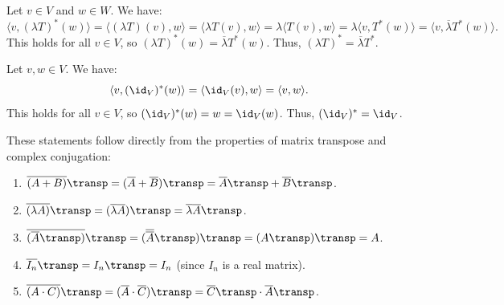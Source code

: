 \begin{exercisesolution}
\label{sol:properties_adjoint_map_c}
Let $v \in V$ and $w \in W$. We have:
\[
    \langle v, (\lambda T)^*(w) \rangle = \langle (\lambda T)(v), w \rangle = \langle \lambda T(v), w \rangle = \lambda \langle T(v), w \rangle = \lambda \langle v, T^*(w) \rangle = \langle v, \overline{\lambda} T^*(w) \rangle.
\]
This holds for all $v \in V$, so $(\lambda T)^*(w) = \overline{\lambda} T^*(w)$. Thus, $(\lambda T)^* = \overline{\lambda} T^*$.
\end{exercisesolution}

\begin{exercisesolution}
\label{sol:properties_adjoint_map_e}
Let $v, w \in V$. We have:
\[
    \langle v, (\id_V)^*(w) \rangle = \langle \id_V(v), w \rangle = \langle v, w \rangle.
\]
This holds for all $v \in V$, so $(\id_V)^*(w) = w = \id_V(w)$. Thus, $(\id_V)^* = \id_V$.
\end{exercisesolution}

\begin{exercisesolution}
\label{sol:properties_adjoint_matrix}
These statements follow directly from the properties of matrix transpose and complex conjugation:
\begin{enumerate}[label=\textbf{(\alph*)}]
    \item $\overline{(A+B)}\transp = (\overline{A} + \overline{B})\transp = \overline{A}\transp + \overline{B}\transp$.
    \item $\overline{(\lambda A)}\transp = (\overline{\lambda} \overline{A})\transp = \overline{\lambda} \overline{A}\transp$.
    \item $\overline{(\overline{A}\transp)}\transp = (\overline{\overline{A}}\transp)\transp = (A\transp)\transp = A$.
    \item $\overline{I_n}\transp = I_n\transp = I_n$ (since $I_n$ is a real matrix).
    \item $\overline{(A \cdot C)}\transp = (\overline{A} \cdot \overline{C})\transp = \overline{C}\transp \cdot \overline{A}\transp$.
\end{enumerate}
\end{exercisesolution}

